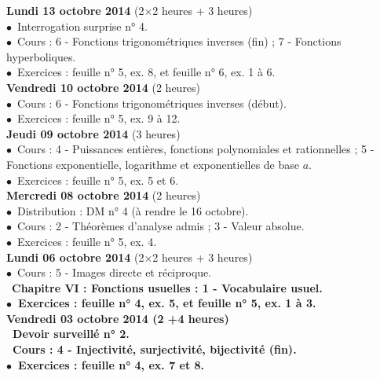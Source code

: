 \documentclass[12pt,a4paper]{article}
\begin{document}
\noindent\textbf{ \bf Lundi 13 octobre 2014 \rm}(2$\times$2 heures + 3
heures)\\
$\bullet$\ Interrogation surprise n° 4.\\
$\bullet$\ Cours :  6 - Fonctions trigonométriques inverses (fin) ; 7 -
Fonctions hyperboliques.\\
$\bullet$\ Exercices : feuille n° 5, ex. 8, et feuille n° 6, ex.
1 à 6.\vspace{.4cm}\\

\noindent\textbf{ \bf Vendredi 10 octobre 2014 \rm}(2 heures)\\
$\bullet$\ Cours :  6 - Fonctions trigonométriques inverses (début).\\
$\bullet$\ Exercices : feuille n° 5, ex. 9 à 12.\vspace{.4cm}\\

\noindent\textbf{\bf Jeudi 09 octobre 2014 \rm} (3 heures)\\
$\bullet$\ Cours : 4 - Puissances entières, fonctions 
polynomiales et rationnelles ; 5 - Fonctions exponentielle, logarithme et 
exponentielles de base $a$.\\
$\bullet$\ Exercices : feuille n° 5, ex. 5 et 6.\vspace{.4cm}\\

\noindent\textbf{\bf Mercredi 08 octobre 2014 \rm} (2 heures)\\
$\bullet$\ Distribution : DM n° 4 (à rendre le 16 octobre).\\
$\bullet$\ Cours : 2 - Théorèmes d'analyse admis ; 3 - Valeur absolue.\\
$\bullet$\ Exercices : feuille n° 5, ex. 4.\vspace{.4cm}\\
 
\noindent\textbf{ \bf Lundi 06 octobre 2014 \rm}(2$\times$2 heures + 3
heures)\\
$\bullet$\ Cours : 5 - Images directe et réciproque.\\
\es\ \bf Chapitre VI \rm : Fonctions usuelles : 1 - Vocabulaire usuel.\\
$\bullet$\ Exercices : feuille n° 4, ex. 5, et feuille n° 5, ex. 1
à 3.\vspace{.4cm}\\
 
\noindent\textbf{ \bf Vendredi 03 octobre 2014 \rm}(2 +4 heures)\\
\bu\ Devoir surveillé n° 2.\vspace{.4cm}\\
\bu\ Cours : 4 - Injectivité, surjectivité, bijectivité (fin).\\
$\bullet$\ Exercices : feuille n° 4, ex. 7 et 8.\vspace{.4cm}\\
\end{document}
